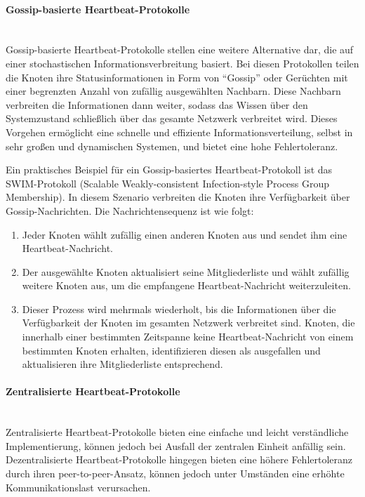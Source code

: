 \documentclass[../vs-script-first-v01.tex]{subfiles}
\begin{document}
\paragraph{Gossip-basierte Heartbeat-Protokolle}\mbox{}\\
Gossip-basierte Heartbeat-Protokolle stellen eine weitere Alternative dar, die auf einer stochastischen Informationsverbreitung basiert. Bei diesen Protokollen teilen die Knoten ihre Statusinformationen in Form von \enquote{Gossip} oder Gerüchten mit einer begrenzten Anzahl von zufällig ausgewählten Nachbarn. Diese Nachbarn verbreiten die Informationen dann weiter, sodass das Wissen über den Systemzustand schließlich über das gesamte Netzwerk verbreitet wird. Dieses Vorgehen ermöglicht eine schnelle und effiziente Informationsverteilung, selbst in sehr großen und dynamischen Systemen, und bietet eine hohe Fehlertoleranz.

Ein praktisches Beispiel für ein Gossip-basiertes Heartbeat-Protokoll ist das SWIM-Protokoll (Scalable Weakly-consistent Infection-style Process Group Membership). In diesem Szenario verbreiten die Knoten ihre Verfügbarkeit über Gossip-Nachrichten. Die Nachrichtensequenz ist wie folgt:
\begin{enumerate}[label=(\alph*)]
\item Jeder Knoten wählt zufällig einen anderen Knoten aus und sendet ihm eine Heartbeat-Nachricht.
\item Der ausgewählte Knoten aktualisiert seine Mitgliederliste und wählt zufällig weitere Knoten aus, um die empfangene Heartbeat-Nachricht weiterzuleiten.
\item Dieser Prozess wird mehrmals wiederholt, bis die Informationen über die Verfügbarkeit der Knoten im gesamten Netzwerk verbreitet sind.
Knoten, die innerhalb einer bestimmten Zeitspanne keine Heartbeat-Nachricht von einem bestimmten Knoten erhalten, identifizieren diesen als ausgefallen und aktualisieren ihre Mitgliederliste entsprechend.
\end{enumerate}
\paragraph{Zentralisierte Heartbeat-Protokolle}\mbox{}\\
Zentralisierte Heartbeat-Protokolle bieten eine einfache und leicht verständliche Implementierung, können jedoch bei Ausfall der zentralen Einheit anfällig sein. Dezentralisierte Heartbeat-Protokolle hingegen bieten eine höhere Fehlertoleranz durch ihren peer-to-peer-Ansatz, können jedoch unter Umständen eine erhöhte Kommunikationslast verursachen.
\end{document}
